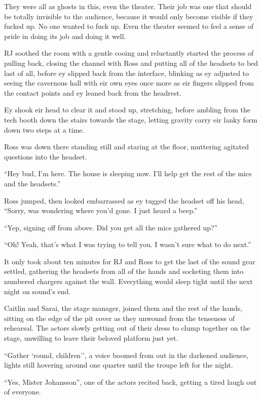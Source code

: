 They were all as ghosts in this, even the theater. Their job was one that should be totally invisible to the audience, because it would only become visible if they fucked up. No one wanted to fuck up. Even the theater seemed to feel a sense of pride in doing its job and doing it well.

RJ soothed the room with a gentle cooing and reluctantly started the process of pulling back, closing the channel with Ross and putting all of the headsets to bed last of all, before ey slipped back from the interface, blinking as ey adjusted to seeing the cavernous hall with eir own eyes once more as eir fingers slipped from the contact points and ey leaned back from the headrest.

Ey shook eir head to clear it and stood up, stretching, before ambling from the tech booth down the stairs towards the stage, letting gravity carry eir lanky form down two steps at a time.

Ross was down there standing still and staring at the floor, muttering agitated questions into the headset.

``Hey bud, I'm here. The house is sleeping now. I'll help get the rest of the mics and the headsets.''

Ross jumped, then looked embarrassed as ey tugged the headset off his head, ``Sorry, was wondering where you'd gone. I just heard a beep.''

``Yep, signing off from above. Did you get all the mics gathered up?''

``Oh! Yeah, that's what I was trying to tell you. I wasn't sure what to do next.''

It only took about ten minutes for RJ and Ross to get the last of the sound gear settled, gathering the headsets from all of the hands and socketing them into numbered chargers against the wall. Everything would sleep tight until the next night on sound's end.

Caitlin and Sarai, the stage manager, joined them and the rest of the hands, sitting on the edge of the pit cover as they unwound from the tenseness of rehearsal. The actors slowly getting out of their dress to clump together on the stage, unwilling to leave their beloved platform just yet.

``Gather `round, children'', a voice boomed from out in the darkened audience, lights still hovering around one quarter until the troupe left for the night.

``Yes, Mister Johansson'', one of the actors recited back, getting a tired laugh out of everyone.

